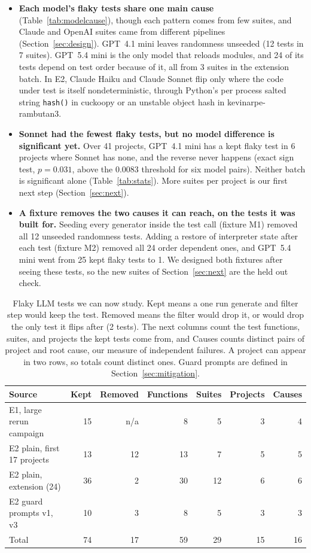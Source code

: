 \documentclass[sigconf,nonacm]{acmart}
\begin{document}
\begin{itemize}
\item \textbf{Each model's flaky tests share one main cause} (Table~\ref{tab:modelcause}), though each pattern comes from few suites, and Claude and OpenAI suites came from different pipelines (Section~\ref{sec:design}). GPT~4.1 mini leaves randomness unseeded (12 tests in 7 suites). GPT~5.4 mini is the only model that reloads modules, and 24 of its tests depend on test order because of it, all from 3 suites in the extension batch. In E2, Claude Haiku and Claude Sonnet flip only where the code under test is itself nondeterministic, through Python's per process salted string \texttt{hash()} in cuckoopy or an unstable object hash in kevinarpe-rambutan3.
\item \textbf{Sonnet had the fewest flaky tests, but no model difference is significant yet.} Over 41 projects, GPT~4.1 mini has a kept flaky test in 6 projects where Sonnet has none, and the reverse never happens (exact sign test, $p = 0.031$, above the 0.0083 threshold for six model pairs). Neither batch is significant alone (Table~\ref{tab:stats}). More suites per project is our first next step (Section~\ref{sec:next}).
\item \textbf{A fixture removes the two causes it can reach, on the tests it was built for.} Seeding every generator inside the test call (fixture M1) removed all 12 unseeded randomness tests. Adding a restore of interpreter state after each test (fixture M2) removed all 24 order dependent ones, and GPT~5.4 mini went from 25 kept flaky tests to 1. We designed both fixtures after seeing these tests, so the new suites of Section~\ref{sec:next} are the held out check.
\end{itemize}

\begin{table}[h]
\caption{Flaky LLM tests we can now study. Kept means a one run generate and filter step would keep the test. Removed means the filter would drop it, or would drop the only test it flips after (2 tests). The next columns count the test functions, suites, and projects the kept tests come from, and Causes counts distinct pairs of project and root cause, our measure of independent failures. A project can appear in two rows, so totals count distinct ones. Guard prompts are defined in Section~\ref{sec:mitigation}.}
\label{tab:count}
\small
\setlength{\tabcolsep}{2pt}
\begin{tabularx}{\columnwidth}{Xrrrrrr}
\toprule
Source & Kept & Removed & Functions & Suites & Projects & Causes \\
\midrule
E1, large rerun campaign & 15 & n/a & 8 & 5 & 3 & 4 \\
E2 plain, first 17 projects & 13 & 12 & 13 & 7 & 5 & 5 \\
E2 plain, extension (24) & 36 & 2 & 30 & 12 & 6 & 6 \\
E2 guard prompts v1, v3 & 10 & 3 & 8 & 5 & 3 & 3 \\
\midrule
Total & 74 & 17 & 59 & 29 & 15 & 16 \\
\bottomrule
\end{tabularx}
\end{table}
\end{document}
